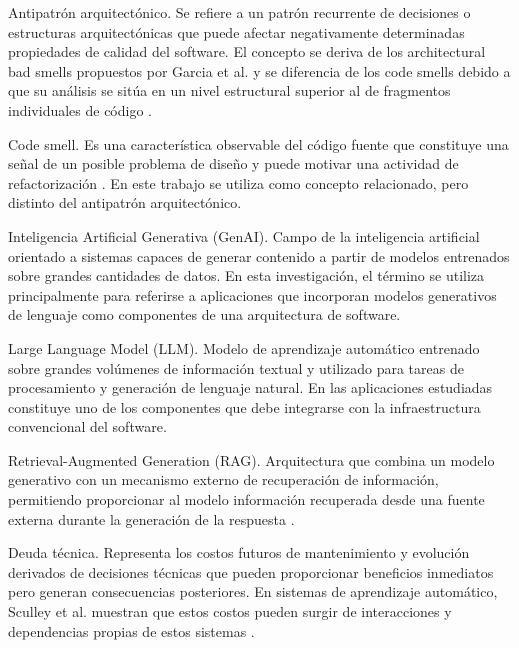 \begin{description}
    \item Antipatrón arquitectónico. Se refiere a un patrón recurrente de decisiones o estructuras arquitectónicas que puede afectar negativamente determinadas propiedades de calidad del software. El concepto se deriva de los architectural bad smells propuestos por Garcia et al. y se diferencia de los code smells debido a que su análisis se sitúa en un nivel estructural superior al de fragmentos individuales de código \cite{garcia_identifying_2009}.

    \item Code smell. Es una característica observable del código fuente que constituye una señal de un posible problema de diseño y puede motivar una actividad de refactorización \cite{fowler_1999}. En este trabajo se utiliza como concepto relacionado, pero distinto del antipatrón arquitectónico.

    \item Inteligencia Artificial Generativa (GenAI). Campo de la inteligencia artificial orientado a sistemas capaces de generar contenido a partir de modelos entrenados sobre grandes cantidades de datos. En esta investigación, el término se utiliza principalmente para referirse a aplicaciones que incorporan modelos generativos de lenguaje como componentes de una arquitectura de software.

    \item Large Language Model (LLM). Modelo de aprendizaje automático entrenado sobre grandes volúmenes de información textual y utilizado para tareas de procesamiento y generación de lenguaje natural. En las aplicaciones estudiadas constituye uno de los componentes que debe integrarse con la infraestructura convencional del software.

    \item Retrieval-Augmented Generation (RAG). Arquitectura que combina un modelo generativo con un mecanismo externo de recuperación de información, permitiendo proporcionar al modelo información recuperada desde una fuente externa durante la generación de la respuesta \cite{lewis_retrieval-augmented_2021}.

    \item Deuda técnica. Representa los costos futuros de mantenimiento y evolución derivados de decisiones técnicas que pueden proporcionar beneficios inmediatos pero generan consecuencias posteriores. En sistemas de aprendizaje automático, Sculley et al. muestran que estos costos pueden surgir de interacciones y dependencias propias de estos sistemas \cite{sculley_hidden_2015}.


\end{description}
